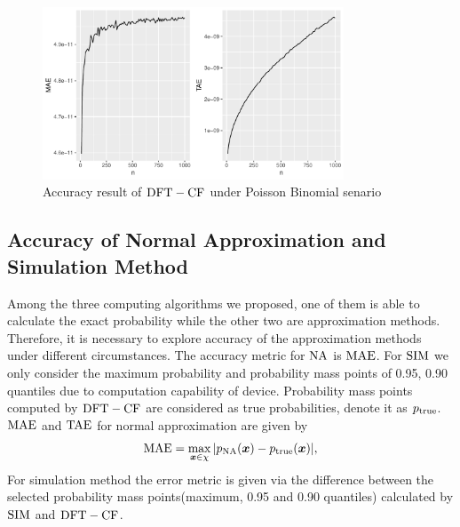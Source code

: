 \documentclass[12pt]{article}
\newcommand{\TAE}{{\rm TAE}}
\newcommand{\MAE}{{\rm MAE}}
\newcommand{\xvec}{\boldsymbol{x}}
\newcommand{\SIM}{{\rm SIM}}
\newcommand{\NA}{{\rm NA}}
\newcommand{\dft}{{\rm DFT-CF}}
\begin{document}
\begin{figure}[h]
	\centering
	\includegraphics[width=0.8\textwidth]{figures/poib.pdf}
	\caption{Accuracy result of $\dft$ under Poisson Binomial senario}
	\label{fig: dft accuracy}
\end{figure}







\subsection{Accuracy of Normal Approximation and Simulation Method}
Among the three computing algorithms we proposed, one of them is able to calculate the exact probability while the other two are approximation methods. Therefore, it is necessary to explore accuracy of the approximation methods under different circumstances. The accuracy metric for $\NA$ is $\MAE$. For $\SIM$ we only consider the maximum probability and probability mass points of 0.95, 0.90 quantiles due to computation capability of device. Probability mass points computed by $\dft$ are considered as true probabilities, denote it as $p_{\rm true}$.
$\MAE$ and $\TAE$ for normal approximation are given by
\begin{equation*}
    \MAE = \max_{\xvec \in \chi}|p_{\NA}(\xvec)-p_{\rm true}(\xvec)|,
\end{equation*}
For simulation method the error metric is given via the difference between the selected probability mass points(maximum, 0.95 and 0.90 quantiles) calculated by $\SIM$ and $\dft$. 
\end{document}
